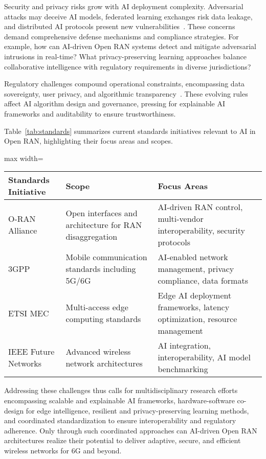 \documentclass[sigconf]{acmart}
\begin{document}
Security and privacy risks grow with AI deployment complexity. Adversarial attacks may deceive AI models, federated learning exchanges risk data leakage, and distributed AI protocols present new vulnerabilities~\cite{ref50}. These concerns demand comprehensive defense mechanisms and compliance strategies. For example, how can AI-driven Open RAN systems detect and mitigate adversarial intrusions in real-time? What privacy-preserving learning approaches balance collaborative intelligence with regulatory requirements in diverse jurisdictions?

Regulatory challenges compound operational constraints, encompassing data sovereignty, user privacy, and algorithmic transparency~\cite{ref48}. These evolving rules affect AI algorithm design and governance, pressing for explainable AI frameworks and auditability to ensure trustworthiness.

Table~\ref{tab:standards} summarizes current standards initiatives relevant to AI in Open RAN, highlighting their focus areas and scopes.

\begin{table*}[htbp]
\centering
\caption{Summary of Current Standards Initiatives for AI in Open RAN}
\label{tab:standards}
\begin{adjustbox}{max width=\textwidth}
\begin{tabular}{@{}lll@{}}
\toprule
\textbf{Standards Initiative} & \textbf{Scope} & \textbf{Focus Areas} \\ \midrule
O-RAN Alliance           & Open interfaces and architecture for RAN disaggregation & AI-driven RAN control, multi-vendor interoperability, security protocols \\
3GPP                   & Mobile communication standards including 5G/6G & AI-enabled network management, privacy compliance, data formats \\
ETSI MEC               & Multi-access edge computing standards & Edge AI deployment frameworks, latency optimization, resource management \\
IEEE Future Networks    & Advanced wireless network architectures             & AI integration, interoperability, AI model benchmarking \\ \bottomrule
\end{tabular}
\end{adjustbox}
\end{table*}

Addressing these challenges thus calls for multidisciplinary research efforts encompassing scalable and explainable AI frameworks, hardware-software co-design for edge intelligence, resilient and privacy-preserving learning methods, and coordinated standardization to ensure interoperability and regulatory adherence. Only through such coordinated approaches can AI-driven Open RAN architectures realize their potential to deliver adaptive, secure, and efficient wireless networks for 6G and beyond.
\end{document}
